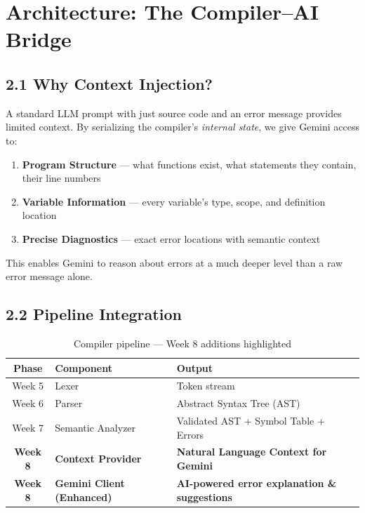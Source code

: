 \documentclass[a4paper,11pt]{article}
\begin{document}
    \section{Architecture: The Compiler--AI Bridge}

    \subsection{2.1 Why Context Injection?}

    A standard LLM prompt with just source code and an error message provides limited context. By serializing the compiler's \textit{internal state}, we give Gemini access to:

    \begin{enumerate}
        \item \textbf{Program Structure} --- what functions exist, what statements they contain, their line numbers
        \item \textbf{Variable Information} --- every variable's type, scope, and definition location
        \item \textbf{Precise Diagnostics} --- exact error locations with semantic context
    \end{enumerate}

    This enables Gemini to reason about errors at a much deeper level than a raw error message alone.

    \subsection{2.2 Pipeline Integration}

    \begin{table}[h]
    \centering
    \begin{tabularx}{\textwidth}{|c|l|X|}
    \hline
    \rowcolor{blue!10}
    \textbf{Phase} & \textbf{Component} & \textbf{Output} \\
    \hline
    Week 5 & Lexer & Token stream \\
    \hline
    Week 6 & Parser & Abstract Syntax Tree (AST) \\
    \hline
    Week 7 & Semantic Analyzer & Validated AST + Symbol Table + Errors \\
    \hline
    \textbf{Week 8} & \textbf{Context Provider} & \textbf{Natural Language Context for Gemini} \\
    \hline
    \textbf{Week 8} & \textbf{Gemini Client (Enhanced)} & \textbf{AI-powered error explanation \& suggestions} \\
    \hline
    \end{tabularx}
    \caption{Compiler pipeline --- Week 8 additions highlighted}
    \end{table}
\end{document}
